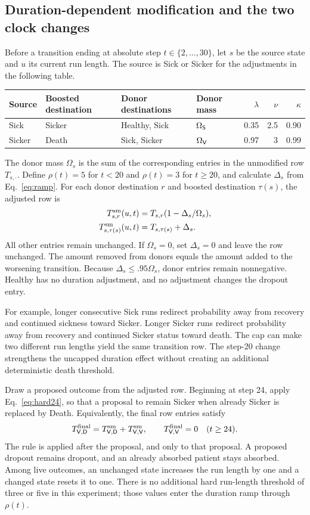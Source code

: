 \subsection{Duration-dependent modification and the two clock changes}
Before a transition ending at absolute step $t\in\{2,\ldots,30\}$, let $s$ be the source state and $u$ its current run length. The source is Sick or Sicker for the adjustments in the following table.
\begin{center}\small
\begin{tabular}{llllrrr}\toprule
Source & Boosted destination & Donor destinations & Donor mass & $\lambda$ & $\nu$ & $\kappa$\\\midrule
Sick & Sicker & Healthy, Sick & $\Omega_{\mathsf S}$ & 0.35 & 2.5 & 0.90\\
Sicker & Death & Sick, Sicker & $\Omega_{\mathsf V}$ & 0.97 & 3 & 0.99\\\bottomrule
\end{tabular}
\end{center}
The donor mass $\Omega_s$ is the sum of the corresponding entries in the unmodified row $T_{s,\cdot}$. Define $\rho(t)=5$ for $t<20$ and $\rho(t)=3$ for $t\ge20$, and calculate $\Delta_s$ from Eq.~\eqref{eq:ramp}. For each donor destination $r$ and boosted destination $\tau(s)$, the adjusted row is
\begin{align}
T^{\rm sm}_{s,r}(u,t)&=T_{s,r}(1-\Delta_s/\Omega_s),\label{eq:donors}\\
T^{\rm sm}_{s,\tau(s)}(u,t)&=T_{s,\tau(s)}+\Delta_s.
\end{align}
All other entries remain unchanged. If $\Omega_s=0$, set $\Delta_s=0$ and leave the row unchanged. The amount removed from donors equals the amount added to the worsening transition. Because $\Delta_s\le.95\Omega_s$, donor entries remain nonnegative. Healthy has no duration adjustment, and no adjustment changes the dropout entry.

For example, longer consecutive Sick runs redirect probability away from recovery and continued sickness toward Sicker. Longer Sicker runs redirect probability away from recovery and continued Sicker status toward death. The cap can make two different run lengths yield the same transition row. The step-20 change strengthens the uncapped duration effect without creating an additional deterministic death threshold.

Draw a proposed outcome from the adjusted row. Beginning at step 24, apply Eq.~\eqref{eq:hard24}, so that a proposal to remain Sicker when already Sicker is replaced by Death. Equivalently, the final row entries satisfy
\[
T^{\rm final}_{\mathsf V,\mathsf D}=T^{\rm sm}_{\mathsf V,\mathsf D}+T^{\rm sm}_{\mathsf V,\mathsf V},
\qquad T^{\rm final}_{\mathsf V,\mathsf V}=0
\quad(t\ge24).
\]
The rule is applied after the proposal, and only to that proposal. A proposed dropout remains dropout, and an already absorbed patient stays absorbed. Among live outcomes, an unchanged state increases the run length by one and a changed state resets it to one. There is no additional hard run-length threshold of three or five in this experiment; those values enter the duration ramp through $\rho(t)$.


